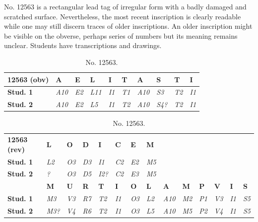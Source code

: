 \documentclass[amsthm,ebook]{saparticle}
\begin{document}
No. 12563 is a rectangular lead tag of irregular form with a badly damaged and scratched surface. Nevertheless, the most
recent inscription is clearly readable while one may still discern traces of older inscriptions. An older inscription
might be visible on the obverse, perhaps series of numbers but its meaning remains unclear. Students have
transcriptions and drawings.


\begin{table}
{\small
\addtolength{\tabcolsep}{-0.7mm}
\begin{tabular*}{\textwidth}{llllllllll}
\toprule
\textbf{12563 (obv)} & \textbf{A} & \textbf{E} & \textbf{L} & \textbf{I} & \textbf{T} & \textbf{A} & \textbf{S} & \textbf{T} & \textbf{I}\\
\midrule
\textbf{Stud. 1} & \textit{A10} & \textit{E2} & \textit{L11} & \textit{I1} & \textit{T1} & \textit{A10} & \textit{S3} & \textit{T2} & \textit{I1} \\
\textbf{Stud. 2} & \textit{A10} & \textit{E2} & \textit{L5} & \textit{I1} & \textit{T2} & \textit{A10} & \textit{S4?} & \textit{T2} & \textit{I1}  \\
\bottomrule
\end{tabular*}

\begin{tabular*}{\textwidth}{llllllllllllll}
 & & & & & & & & & & & & & \\
\toprule
\textbf{12563 (rev)} & \textbf{L} & \textbf{O} & \textbf{D} & \textbf{I} & \textbf{C} & \textbf{E} & \textbf{M} & & & & & &\\
\midrule
\textbf{Stud. 1} & \textit{L2} & \textit{O3} & \textit{D3} & \textit{I1} & \textit{C2} & \textit{E2} & \textit{M5} &  &  & & & & \\
\textbf{Stud. 2} & \textit{?} & \textit{O3} & \textit{D5} & \textit{I2?} & \textit{C2} & \textit{E3} & \textit{M5} & & & & & &  \\
\midrule
 & \textbf{M} & \textbf{U} & \textbf{R} & \textbf{T} & \textbf{I} & \textbf{O} & \textbf{L} & \textbf{A} & \textbf{M} & \textbf{P} & \textbf{V} & \textbf{I} & \textbf{S}\\
 \midrule
\textbf{Stud. 1}& \textit{M3} & \textit{V3} & \textit{R7} & \textit{T2} & \textit{I1} & \textit{O3} & \textit{L2} & \textit{A10} & \textit{M2} & \textit{P1} & \textit{V3} & \textit{I1} & \textit{S5} \\
\textbf{Stud. 2} & \textit{M3?} & \textit{V4} & \textit{R6} & \textit{T2} & \textit{I1} & \textit{O3} & \textit{L5} & \textit{A10} & \textit{M5} & \textit{P2} & \textit{V4} & \textit{I1} & \textit{S5} \\
\bottomrule
\end{tabular*}}

\caption{No. 12563.}
\label{tab:table1}
\end{table}
\end{document}
